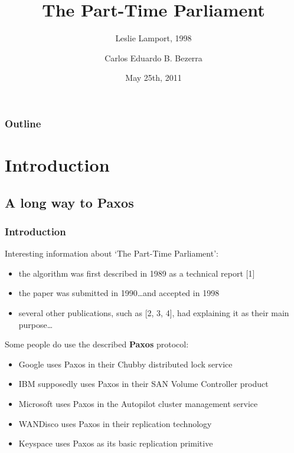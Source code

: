 \documentclass[10 pt]{beamer}
\title[{\makebox[.45\paperwidth]{The Part-Time Parliament\hfill\insertframenumber/\inserttotalframenumber}}]{The Part-Time Parliament}
\subtitle{Leslie Lamport, 1998}
\author{Carlos Eduardo B. Bezerra}
\institute[Universities of]
{
Faculty of Informatics\\
Universittà della Svizzera italiana
}
\date{May 25th, 2011}
\begin{document}
\begin{frame}
  \titlepage
\end{frame}



\begin{frame}
  \frametitle{Outline}
  \tableofcontents
\end{frame}



\section{Introduction}

\subsection{A long way to Paxos}

\begin{frame}
  \frametitle{Introduction}

  Interesting information about `The Part-Time Parliament':
  
  \begin{itemize}
    \item the algorithm was first described in 1989 as a technical report [1]
    \item the paper was submitted in 1990\ldots and accepted in 1998%
    \item several other publications, such as [2, 3, 4], had explaining it as their main purpose\ldots
  \end{itemize}
  
  \vspace{3mm}
  
  Some people do use the described \textbf{Paxos} protocol: %

  \begin{itemize}
    \item Google uses Paxos in their Chubby distributed lock service
    \item IBM supposedly uses Paxos in their SAN Volume Controller product
    \item Microsoft uses Paxos in the Autopilot cluster management service
    \item WANDisco uses Paxos in their replication technology
    \item Keyspace uses Paxos as its basic replication primitive
  \end{itemize}

\end{frame}
\end{document}

